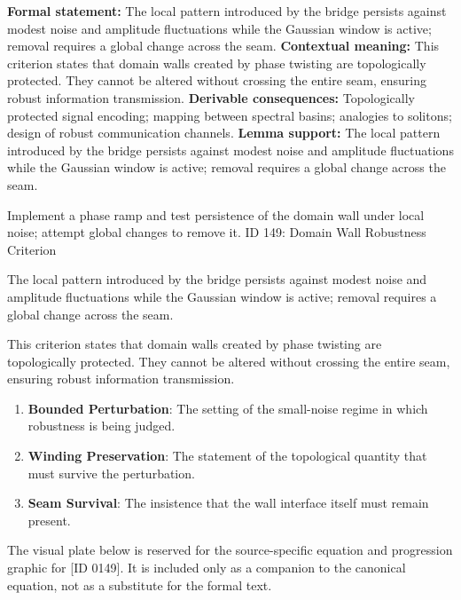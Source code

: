 \begingroup\footnotesize\setlength{\emergencystretch}{3em}\sloppy
\textbf{Formal statement:} The local pattern introduced by the bridge persists against modest noise and amplitude fluctuations while the Gaussian window is active; removal requires a global change across the seam.
\textbf{Contextual meaning:} This criterion states that domain walls created by phase twisting are topologically protected. They cannot be altered without crossing the entire seam, ensuring robust information transmission.
\textbf{Derivable consequences:} Topologically protected signal encoding; mapping between spectral basins; analogies to solitons; design of robust communication channels.
\textbf{Lemma support:} The local pattern introduced by the bridge persists against modest noise and amplitude fluctuations while the Gaussian window is active; removal requires a global change across the seam.\par
\endgroup

Implement a phase ramp and test persistence of the domain wall under local noise; attempt global changes to remove it. ID 149: Domain Wall Robustness Criterion

The local pattern introduced by the bridge persists against modest noise and amplitude fluctuations while the Gaussian window is active; removal requires a global change across the seam.

This criterion states that domain walls created by phase twisting are topologically protected. They cannot be altered without crossing the entire seam, ensuring robust information transmission.
\endgroup

\begin{enumerate}[leftmargin=1.6em,itemsep=6pt,topsep=4pt]
\item \textbf{Bounded Perturbation}: The setting of the small-noise regime in which robustness is being judged.
\item \textbf{Winding Preservation}: The statement of the topological quantity that must survive the perturbation.
\item \textbf{Seam Survival}: The insistence that the wall interface itself must remain present.
\end{enumerate}

\begingroup\footnotesize\sloppy
The visual plate below is reserved for the source-specific equation and progression graphic for [ID 0149]. It is included only as a companion to the canonical equation, not as a substitute for the formal text.
\par\endgroup
\ifTZPDarkEdition
{}
\fi

